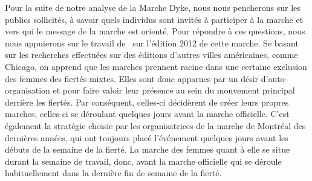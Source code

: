 Pour la suite de notre analyse de la Marche Dyke, nous nous pencherons sur les publics sollicités, à savoir quels individus sont invités à participer à la marche et vers qui le message de la marche est orienté.
Pour répondre à ces questions, nous nous appuierons sur le travail de~\cite{Podmore2015a} sur l'édition 2012 de cette marche.
Se basant sur les recherches effectuées sur des éditions d'autres villes américaines, comme Chicago, on apprend que les marches \dykes{} prennent racine dans une certaine exclusion des femmes des fiertés mixtes.
Elles sont donc apparues par un désir d'auto-organisation et pour faire valoir leur présence au sein du mouvement principal derrière les fiertés.
Par conséquent, celles-ci décidèrent de créer leurs propres marches, celles-ci se déroulant quelques jours avant la marche officielle.
C'est également la stratégie choisie par les organisatrices de la marche de Montréal des dernières années, qui ont toujours placé l'événement quelques jours avant les débuts de la semaine de la fierté.
La marche des femmes quant à elle se situe durant la semaine de travail, donc, avant la marche officielle qui se déroule habituellement dans la dernière fin de semaine de la fierté.

